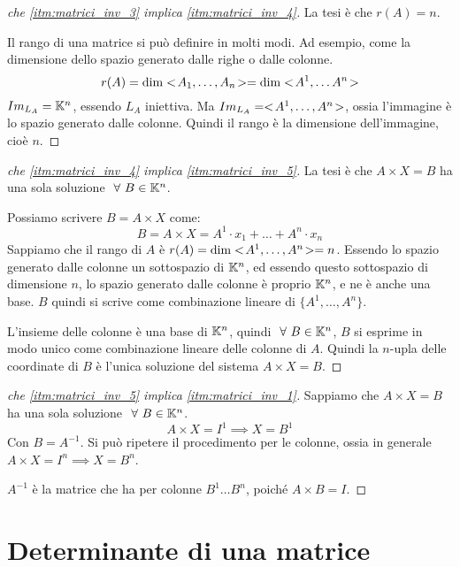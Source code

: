\begin{proof}[che \ref{itm:matrici_inv_3} implica \ref{itm:matrici_inv_4}]
La tesi \`e che $r(A) = n$.

Il rango di una matrice si pu\`o definire in molti modi. Ad esempio, come la dimensione dello spazio generato dalle righe o dalle colonne.
\[
r(A) = \dim <\!{A_1, \ldots, A_n}\!> = \dim <\!{A^1, \ldots A^n}\!>
\]
$Im_{L_A} = \mathbb{K}^n$, essendo $L_A$ iniettiva. Ma $Im_{L_A} = <\!{A^1, \ldots, A^n}\!>$, ossia l'immagine \`e lo spazio generato dalle colonne. Quindi il rango \`e la dimensione dell'immagine, cio\`e $n$.
\end{proof}

\begin{proof}[che \ref{itm:matrici_inv_4} implica \ref{itm:matrici_inv_5}]
La tesi \`e che $A \times X = B$ ha una sola soluzione $\forall B \in \field^n$.

Possiamo scrivere $B = A \times X$ come:
\[
B = A \times X = A^1 \cdot x_1 + \ldots + A^n \cdot x_n
\]
Sappiamo che il rango di $A$ \`e $r(A) = \dim <\!{A^1, \ldots, A^n}\!> = n$. Essendo lo spazio generato dalle colonne un sottospazio di $\mathbb{K}^n$, ed essendo questo sottospazio di dimensione $n$, lo spazio generato dalle colonne \`e proprio $\mathbb{K}^n$, e ne \`e anche una base. $B$ quindi si scrive come combinazione lineare di $\{A^1, \ldots, A^n\}$.

L'insieme delle colonne \`e una base di $\mathbb{K}^n$, quindi $\forall B \in \field^n$, $B$ si esprime in modo unico come combinazione lineare delle colonne di $A$. Quindi la $n$-upla delle coordinate di $B$ \`e l'unica soluzione del sistema $A \times X = B$.
\end{proof}

\begin{proof}[che \ref{itm:matrici_inv_5} implica \ref{itm:matrici_inv_1}]
Sappiamo che $A \times X = B$ ha una sola soluzione $\forall B \in \field^n$.
\[
A \times X = I^1 \implies X = B^1
\]
Con $B = A^{-1}$. Si pu\`o ripetere il procedimento per le colonne, ossia in generale $A \times X = I^n \implies X = B^n$.

$A^{-1}$ \`e la matrice che ha per colonne $B^1 \ldots B^n$, poich\'e $A \times B = I$.
\end{proof}

\section{Determinante di una matrice}

